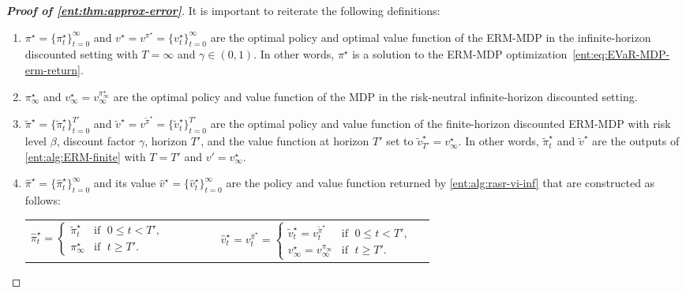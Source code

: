 \documentclass[twoside]{article}
\newcommand{\opt}{^\star}
\theoremstyle{plain}
\theoremstyle{definition}
\theoremstyle{remark}
\begin{document}
\begin{proof}[\bf\em Proof of \cref{ent:thm:approx-error}]
It is important to reiterate the following definitions: 
\begin{enumerate}
\item $\pi^\star=\{\pi^\star_t\}_{t=0}^\infty$ and $v^\star = v^{\pi^\star} = \{v^\star_t\}_{t=0}^\infty$ are the optimal policy and optimal value function of the ERM-MDP in the infinite-horizon discounted setting with $T=\infty$ and $\gamma\in (0,1)$. In other words, $\pi^\star$ is a solution to the ERM-MDP optimization~\eqref{ent:eq:EVaR-MDP-erm-return}.
\item $\pi_\infty\opt$ and $v_{\infty}\opt =v^{\pi_{\infty}\opt}_{\infty}$ are the optimal policy and value function of the MDP in the risk-neutral infinite-horizon discounted setting.
\item $\tilde{\pi}^\star = \{\tilde{\pi}^\star_t\}_{t=0}^{T'}$ and $\tilde{v}^\star=v^{\tilde{\pi}^\star} = \{\tilde{v}^\star_t\}_{t=0}^{T'}$ are the optimal policy and value function of the finite-horizon discounted ERM-MDP with risk level $\beta$, discount factor $\gamma$, horizon $T'$, and the value function at horizon $T'$ set to $\tilde{v}^\star_{T'}=v_{\infty}\opt$. In other words, $\tilde{\pi}^\star_t$ and $\tilde{v}^\star$ are the outputs of \cref{ent:alg:ERM-finite} with $T = T'$ and $v'=v_{\infty}\opt$.
\item $\hat{\pi}\opt = \{\hat{\pi}^\star_t\}_{t=0}^\infty$ and its value $\hat{v}^\star = \{\hat{v}^\star_t\}_{t=0}^\infty$ are the policy and value function returned by \cref{ent:alg:rasr-vi-inf} that are constructed as follows: 
\begin{center}
\begin{tabular}{lllllll}
$\hat{\pi}^\star_t = 
\begin{cases}
\tilde{\pi}^\star_t & \text{if } \; 0 \leq t < T', \\
\pi_{\infty}\opt & \text{if } \; t \geq T'.
\end{cases}$ & & & & & 
$\hat{v}^\star_t = v^{\hat{\pi}^\star}_t = 
\begin{cases}
\tilde{v}^\star_t = v^{\tilde{\pi}^\star}_t & \text{if } \; 0 \leq t < T', \\
v_{\infty}\opt  = v^{\pi_{\infty}}_{\infty} & \text{if } \; t \geq T'.
\end{cases}$
\end{tabular}
\end{center}
\end{enumerate}


\end{proof}
\end{document}
